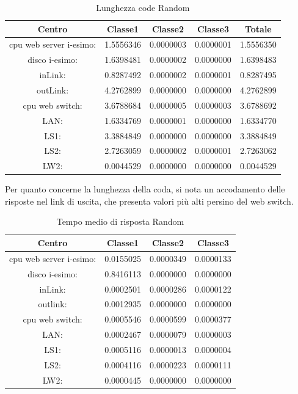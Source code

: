 \begin{table}[H]
\begin{center}
\begin{tabular}{||c|c|c|c|c||}
\hline
Centro &Classe1 &Classe2 &Classe3 &Totale\\
\hline
\hline
 cpu web server i-esimo: 	&1.5556346	&0.0000003	&0.0000001	&1.5556350\\
\hline
 disco i-esimo: 	&1.6398481	&0.0000002	&0.0000000	&1.6398483\\
\hline
 inLink: 	&0.8287492	&0.0000002	&0.0000001	&0.8287495\\
\hline
 outLink: 	&4.2762899	&0.0000000	&0.0000000	&4.2762899\\
\hline
 cpu web switch: 	&3.6788684	&0.0000005	&0.0000003	&3.6788692\\
\hline
 LAN: 	&1.6334769	&0.0000001	&0.0000000	&1.6334770\\
\hline
 LS1: 	&3.3884849	&0.0000000	&0.0000000	&3.3884849\\
\hline
 LS2: 	&2.7263059	&0.0000002	&0.0000001	&2.7263062\\
\hline
 LW2: 	&0.0044529	&0.0000000	&0.0000000	&0.0044529\\
\hline
\end{tabular}
\end{center}
\caption{Lunghezza code Random}
\label{ris}
\end{table}
Per quanto concerne la lunghezza della coda, si nota un accodamento delle risposte nel link di uscita, che presenta valori più alti persino del web switch.
\begin{table}[H]
\begin{center}
\begin{tabular}{||c|c|c|c||}
\hline
Centro &Classe1 &Classe2 &Classe3\\
\hline
\hline
 cpu web server i-esimo: 	&0.0155025	&0.0000349	&0.0000133\\
\hline
 disco i-esimo: 	&0.8416113	&0.0000000	&0.0000000\\
\hline
 inLink: 	&0.0002501	&0.0000286	&0.0000122\\
\hline
 outlink: 	&0.0012935	&0.0000000	&0.0000000\\
\hline
 cpu web switch: 	&0.0005546	&0.0000599	&0.0000377\\
\hline
 LAN: 	&0.0002467	&0.0000079	&0.0000003\\
\hline
 LS1: 	&0.0005116	&0.0000013	&0.0000004\\
\hline
 LS2: 	&0.0004116	&0.0000223	&0.0000111\\
\hline
 LW2: 	&0.0000445	&0.0000000	&0.0000000\\
\hline
\end{tabular}
\end{center}
\caption{Tempo medio di risposta Random}
\label{tempomediorisposta}
\end{table}
